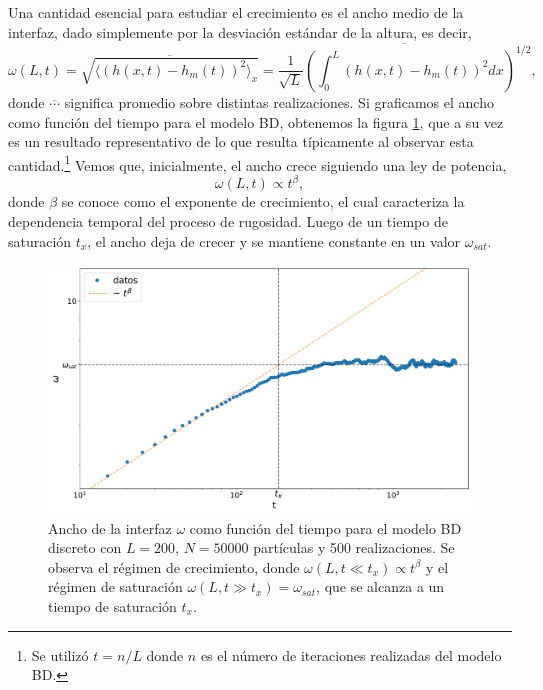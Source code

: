 Una cantidad esencial para estudiar el crecimiento es el ancho medio de la interfaz, dado simplemente por la desviación estándar de la altura, es decir,
\begin{equation}
\omega(L,t) = \overline{\sqrt{\langle (h(x,t) - h_m(t))^2 \rangle_x}}= \overline{\frac{1}{\sqrt{L}}\left(\int_{0}^{L}(h(x,t) - h_m(t))^2 dx\right)^{1/2}},
\end{equation}
donde $\overline{\cdots}$ significa promedio sobre distintas realizaciones.
Si graficamos el ancho como función del tiempo para el modelo BD, obtenemos la figura \ref{fig:width}, que a su vez es un resultado representativo de lo que 
resulta típicamente al observar esta cantidad.\footnote{Se utilizó $t = n/L$ donde $n$ es el número de iteraciones realizadas del modelo BD.} Vemos que, inicialmente, el ancho crece siguiendo una ley de potencia, 
\begin{equation}
\omega (L,t) \propto t^{\beta},
\end{equation}
donde $\beta$ se conoce como el exponente de crecimiento, el cual caracteriza la dependencia temporal del proceso de rugosidad. Luego de un tiempo de saturación $t_x$, 
el ancho deja de crecer y se mantiene constante en un valor $\omega_{sat}$.

\begin{figure}[!b]
    \centering
    \includegraphics[width=\imsizeL]{width.pdf}
    \caption[Ancho de la interfaz como función del tiempo para el modelo BD discreto.]{Ancho de la interfaz $\omega$ como función del tiempo para el modelo BD discreto con $L = 200$, $N = 50000$ partículas y 500 realizaciones. Se observa el régimen de crecimiento, 
    donde $\omega(L,t \ll t_x) \propto t^\beta$ y el régimen de saturación $\omega(L,t \gg t_x) = \omega_{sat}$, que se alcanza a un tiempo de saturación $t_x$.}
    \label{fig:width}
\end{figure}


